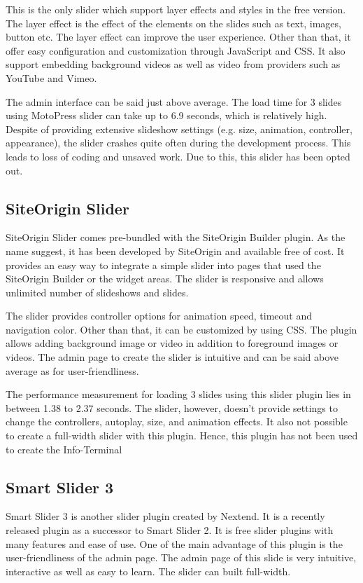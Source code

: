 This is the only slider which support layer effects and styles in the free version. The layer effect is the effect of the elements on the slides such as text, images, button etc. The layer effect can improve the user experience. Other than that, it offer easy configuration and customization through JavaScript and CSS. It also support embedding background videos as well as video from providers such as YouTube and Vimeo.

The admin interface can be said just above average. The load time for 3 slides using MotoPress slider can take up to 6.9 seconds, which is relatively high. Despite of providing extensive slideshow settings (e.g. size, animation, controller, appearance), the slider crashes quite often during the development process. This leads to loss of coding and unsaved work. Due to this, this slider has been opted out.

\subsection{SiteOrigin Slider}
SiteOrigin Slider \cite{SiteOrigin.2015}\cite{GregPriday.2014} comes pre-bundled with the SiteOrigin Builder plugin. As the name suggest, it has been developed by SiteOrigin and available free of cost. It provides an easy way to integrate a simple slider into pages that used the SiteOrigin Builder or the widget areas. The slider is responsive and allows unlimited number of slideshows and slides.

The slider provides controller options for animation speed, timeout and navigation color. Other than that, it can be customized by using CSS. The plugin allows adding background image or video in addition to foreground images or videos. The admin page to create the slider is intuitive and can be said above average as for user-friendliness.

The performance measurement for loading 3 slides using this slider plugin lies in between 1.38 to 2.37 seconds. The slider, however, doesn't provide settings to change the controllers, autoplay, size, and animation effects. It also not possible to create a full-width slider with this plugin. Hence, this plugin has not been used to create the Info-Terminal

\subsection{Smart Slider 3}
Smart Slider 3 \cite{Nextendweb.2015}\cite{Nextendweb.2015b} is another slider plugin created by Nextend. It is a recently released plugin as a successor to Smart Slider 2. It is free slider plugins with many features and ease of use. One of the main advantage of this plugin is the user-friendliness of the admin page. The admin page of this slide is very intuitive, interactive as well as easy to learn. The slider can built full-width.

